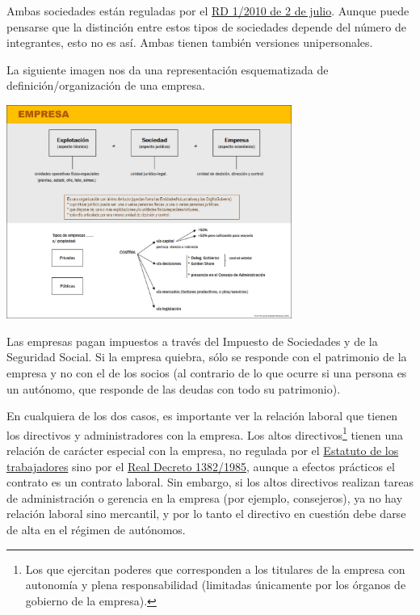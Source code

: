 \documentclass[nochap,palatino,shortheader]{apuntes}
\begin{document}
Ambas sociedades están reguladas por el \href{https://www.boe.es/buscar/act.php?id=BOE-A-2010-10544}{RD 1/2010 de 2 de julio}. Aunque puede pensarse que la distinción entre estos tipos de sociedades depende del número de integrantes, esto no es así. Ambas tienen también versiones unipersonales.

La siguiente imagen nos da una representación esquematizada de definición/organización de una empresa.

\begin{center}
\includegraphics[width=0.7\textwidth]{img/empresa.png}
\label{fig:EstructuraEmpresa}
\end{center}

Las empresas pagan impuestos a través del Impuesto de Sociedades y de la Seguridad Social. Si la empresa quiebra, sólo se responde con el patrimonio de la empresa y no con el de los socios (al contrario de lo que ocurre si una persona es un autónomo, que responde de las deudas con todo su patrimonio).

En cualquiera de los dos casos, es importante ver la relación laboral que tienen los directivos y administradores con la empresa. Los altos directivos\footnote{Los que ejercitan poderes que corresponden a los titulares de la empresa con autonomía y plena responsabilidad (limitadas únicamente por los órganos de gobierno de la empresa).} tienen una relación de carácter especial con la empresa, no regulada por el \href{https://www.boe.es/buscar/act.php?id=BOE-A-1995-7730&tn=1&vd=&p=20151024}{Estatuto de los trabajadores} sino por el \href{https://www.boe.es/diario_boe/txt.php?id=BOE-A-1985-17006}{Real Decreto 1382/1985}, aunque a efectos prácticos el contrato es un contrato laboral. Sin embargo, si los altos directivos realizan tareas de administración o gerencia en la empresa (por ejemplo, consejeros), ya no hay relación laboral sino mercantil, y por lo tanto el directivo en cuestión debe darse de alta en el régimen de autónomos.
\end{document}

